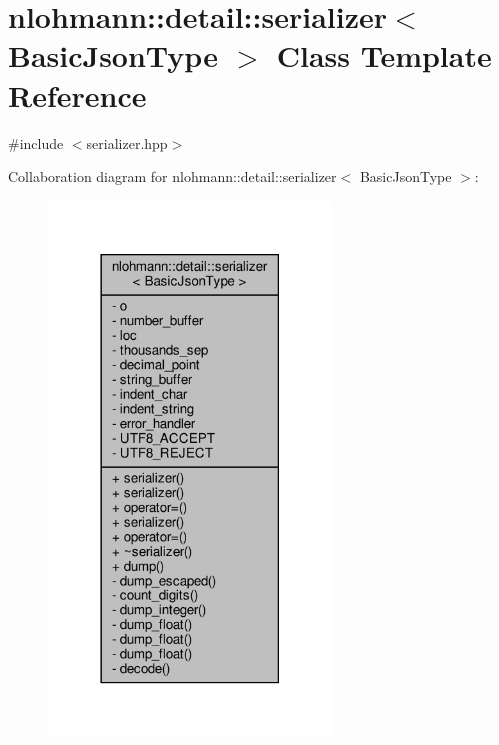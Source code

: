 \hypertarget{classnlohmann_1_1detail_1_1serializer}{}\section{nlohmann\+:\+:detail\+:\+:serializer$<$ Basic\+Json\+Type $>$ Class Template Reference}
\label{classnlohmann_1_1detail_1_1serializer}


{\ttfamily \#include $<$serializer.\+hpp$>$}



Collaboration diagram for nlohmann\+:\+:detail\+:\+:serializer$<$ Basic\+Json\+Type $>$\+:
\nopagebreak
\begin{figure}[H]
\begin{center}
\leavevmode
\includegraphics[width=213pt]{classnlohmann_1_1detail_1_1serializer__coll__graph}
\end{center}
\end{figure}
